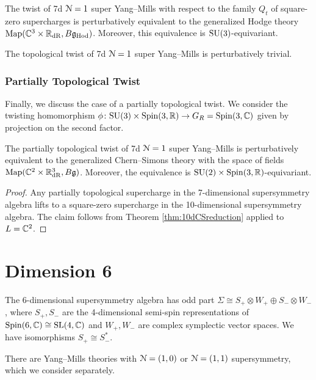 \documentclass[10pt, oneside]{article}
\newcommand{\Hod}{\mathrm{Hod}}
\begin{document}
\begin{theorem}
The twist of 7d $\mathcal N=1$ super Yang--Mills with respect to the family $Q_t$ of square-zero supercharges is perturbatively equivalent to the generalized Hodge theory $\map(\CC^3\times \RR_{\mr{dR}}, B\fg_{\Hod})$. Moreover, this equivalence is $\mathrm{SU}(3)$-equivariant.
\label{thm:7dHodgetwist}
\end{theorem}

\begin{corollary}
The topological twist of 7d $\mathcal N=1$ super Yang--Mills is perturbatively trivial.
\end{corollary}

\subsubsection{Partially Topological Twist}
\label{sect:7dpartialtwist}

Finally, we discuss the case of a partially topological twist. We consider the twisting homomorphism $\phi\colon \mathrm{SU}(3)\times \mathrm{Spin}(3, \mathbb R)\rightarrow G_R=\mathrm{Spin}(3, \mathbb C)$ given by projection on the second factor.

\begin{theorem}
The partially topological twist of 7d $\mathcal N=1$ super Yang--Mills is perturbatively equivalent to the generalized Chern--Simons theory with the space of fields $\operatorname{Map}(\mathbb C^2\times \mathbb R^3_{\mathrm{dR}}, B\mathfrak g)$. Moreover, the equivalence is $\mathrm{SU}(2)\times \mathrm{Spin}(3, \mathbb R)$-equivariant.
\label{thm:7dpartiallytopologicaltwist}
\end{theorem}
\begin{proof}
Any partially topological supercharge in the 7-dimensional supersymmetry algebra lifts to a square-zero supercharge in the 10-dimensional supersymmetry algebra. The claim follows from Theorem \ref{thm:10dCSreduction} applied to $L=\mathbb C^2$.
\end{proof}

\section{Dimension 6}

The 6-dimensional supersymmetry algebra has odd part $\Sigma\cong S_+\otimes W_+\oplus S_-\otimes W_-$, where $S_+, S_-$ are the 4-dimensional semi-spin representations of $\mathrm{Spin}(6, \mathbb C)\cong \mathrm{SL}(4, \mathbb C)$ and $W_+, W_-$ are complex symplectic vector spaces. We have isomorphisms $S_+\cong S_-^*$.

There are Yang--Mills theories with $\mathcal N=(1, 0)$ or $\mathcal N=(1, 1)$ supersymmetry, which we consider separately.
\end{document}
